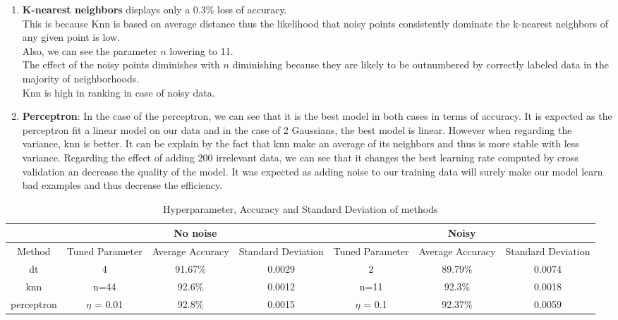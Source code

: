 \documentclass[acmconf,nonacm=true]{acmart}
\begin{document}
\begin{enumerate}
\begin{enumerate}
    \item \textbf{K-nearest neighbors} displays only a 0.3\% loss of accuracy.\\
    This is because Knn is based on average distance thus the likelihood that noisy points consistently dominate the k-nearest neighbors of any given point is low.\\
    Also, we can see the parameter $n$ lowering to 11.\\
    The effect of the noisy points diminishes with $n$ diminishing because they are likely to be outnumbered by correctly labeled data in the majority of neighborhoods.\\
    Knn is high in ranking in case of noisy data.
    \item \textbf{Perceptron}:
    In the case of the perceptron, we can see that it is the best model in both cases in terms of accuracy. It is expected as the perceptron fit a linear model on our data and in the case of 2 Gaussians, the best model is linear. However when regarding the variance, knn is better. It can be explain by the fact that knn make an average of its neighbors and thus is more stable with less variance. Regarding the effect of adding 200 irrelevant data, we can see that it changes the best learning rate computed by cross validation an decrease the quality of the model. It was expected as adding noise to our training data will surely make our model learn bad examples and thus decrease the efficiency. 

\end{enumerate}
\begin{table}[H]
    \centering
    \caption{Hyperparameter, Accuracy and Standard Deviation of methods}
    \begin{tabular}{|c||c|c|c||c|c|c|}
    \hline
    \multicolumn{1}{|c||}{} &\multicolumn{3}{c||}{No noise} & \multicolumn{3}{c|}{Noisy} \\
    \hline
    Method & Tuned Parameter & Average Accuracy & Standard Deviation & Tuned Parameter & Average Accuracy & Standard Deviation\\
    \hline
    dt & 4 & 91.67\% & 0.0029 & 2 & 89.79\% & 0.0074\\
    knn & n=44 & 92.6\% & 0.0012 & n=11 & 92.3\% & 0.0018\\
    perceptron & $\eta$ = 0.01 &  92.8\% & 0.0015 & $\eta$ = 0.1 & 92.37\% & 0.0059\\
    \hline
    \end{tabular}
\end{table}

\end{enumerate}
\end{document}
